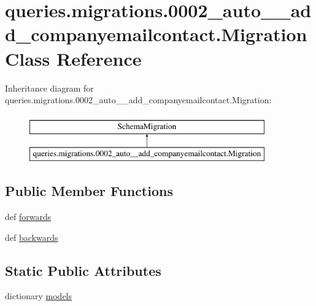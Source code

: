 \hypertarget{classqueries_1_1migrations_1_10002__auto____add__companyemailcontact_1_1_migration}{\section{queries.\-migrations.0002\-\_\-auto\-\_\-\-\_\-add\-\_\-companyemailcontact.Migration Class Reference}
\label{classqueries_1_1migrations_1_10002__auto____add__companyemailcontact_1_1_migration}
}
Inheritance diagram for queries.\-migrations.0002\-\_\-auto\-\_\-\-\_\-add\-\_\-companyemailcontact.Migration\-:\begin{figure}[H]
\begin{center}
\leavevmode
\includegraphics[height=2.000000cm]{classqueries_1_1migrations_1_10002__auto____add__companyemailcontact_1_1_migration}
\end{center}
\end{figure}
\subsection*{Public Member Functions}
\begin{DoxyCompactItemize}
\item 
def \hyperlink{classqueries_1_1migrations_1_10002__auto____add__companyemailcontact_1_1_migration_adcf4517a9be4ca42470e0d821b05ae92}{forwards}
\item 
def \hyperlink{classqueries_1_1migrations_1_10002__auto____add__companyemailcontact_1_1_migration_a9bede0194363dc29b3d80b547769bc7c}{backwards}
\end{DoxyCompactItemize}
\subsection*{Static Public Attributes}
\begin{DoxyCompactItemize}
\item 
dictionary \hyperlink{classqueries_1_1migrations_1_10002__auto____add__companyemailcontact_1_1_migration_a15d43e59a4b3243f164bf5fd78735146}{models}
\end{DoxyCompactItemize}


